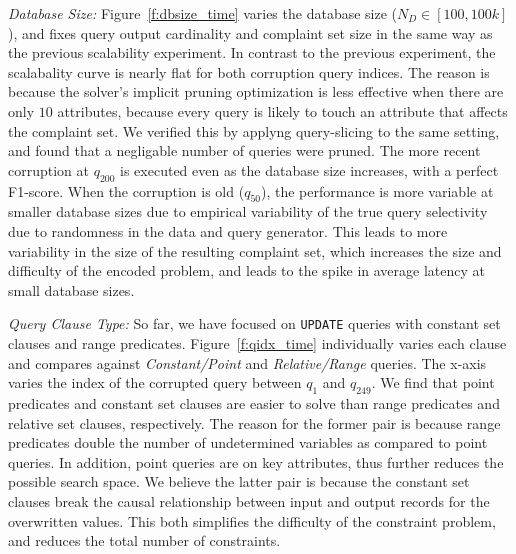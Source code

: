\emph{Database Size:}
Figure~\ref{f:dbsize_time} varies the database size ($N_D \in [100, 100k]$), and fixes query output cardinality and complaint set size in the same way as the previous scalability experiment.
In contrast to the previous experiment, the scalabality curve is nearly flat for both corruption query indices.
The reason is because the solver's implicit pruning optimization is less effective when there are only $10$ attributes, because every query is likely to touch an attribute that affects the complaint set.
We verified this by applyng query-slicing to the same setting, and found that a negligable number of queries were pruned.
The more recent corruption at $q_{200}$ is executed  even as the database size increases, with a perfect F1-score. 
When the corruption is old ($q_{50}$), the performance is more variable at smaller database sizes due to empirical variability of the true query selectivity due to randomness in the data and query generator.
This leads to more variability in the size of the resulting complaint set, which increases the size and difficulty of the encoded problem, and leads to the spike in average latency at small database sizes.



\emph{Query Clause Type: }
So far, we have focused on \texttt{UPDATE} queries with constant set clauses and range predicates.  
Figure~\ref{f:qidx_time} individually varies each clause and compares against {\it Constant/Point} and {\it Relative/Range} queries. 
The x-axis varies the index of the corrupted query between $q_1$ and $q_{249}$.
We find that point predicates and constant set clauses are easier to solve than range predicates and relative set clauses, respectively.
The reason for the former pair is because range predicates double the number of undetermined variables as compared to point queries.  
In addition, point queries are on key attributes, thus further reduces the possible search space.  
We believe the latter pair is because the constant set clauses break the causal relationship between input and output records for the overwritten values.
This both simplifies the difficulty of the constraint problem, and reduces the total number of constraints.

